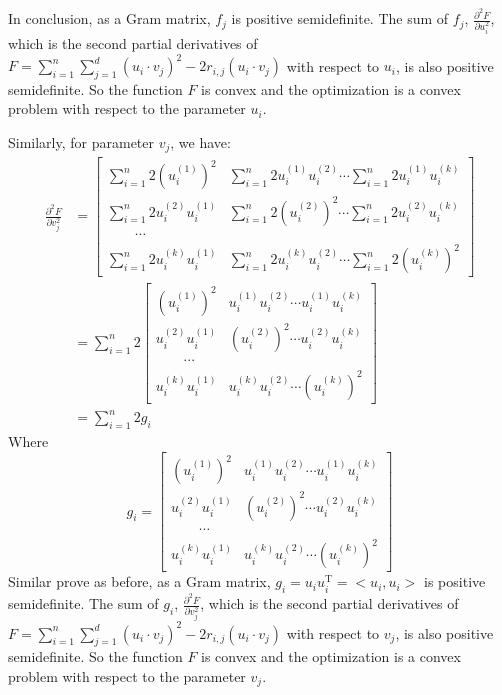 \documentclass[twoside,11pt]{homework}
\begin{document}
In conclusion, as a Gram matrix, $f_j$ is  positive semidefinite.
The sum of $f_j$, $\frac{\partial^2 F}{\partial u_i ^2}$, which is the second partial derivatives of $F = \sum\limits_{i=1}^n \sum\limits_{j=1}^d (u_i \cdot v_j)^2 - 2r_{i, j} (u_i \cdot v_j)$ with respect to $u_i$, is also positive semidefinite.
So the function $F$ is convex and the optimization is a convex problem with respect to the parameter $u_i$.

Similarly, for parameter $v_j$, we have:
%
\begin{equation}
\begin{split}
\frac{\partial^2 F}{\partial v_j ^2} &= \left [ 
						 \begin{matrix}
						 	\sum\limits_{i=1}^n 2(u_i^{(1)})^2 & \sum\limits_{i=1}^n 2u_i^{(1)}u_i^{(2)}	   \cdots \sum\limits_{i=1}^n 2u_i^{(1)}u_i^{(k)}   \\
							\sum\limits_{i=1}^n 2u_i^{(2)}u_i^{(1)} & \sum\limits_{i=1}^n 2(u_i^{(2)})^2	   \cdots \sum\limits_{i=1}^n 2u_i^{(2)}u_i^{(k)} \\
							\qquad \cdots \\
							\sum\limits_{i=1}^n 2u_i^{(k)}u_i^{(1)} & \sum\limits_{i=1}^n 2u_i^{(k)}u_i^{(2)}	   \cdots \sum\limits_{i=1}^n 2(u_i^{(k)})^2
						 \end{matrix}
						\right ] \\
					    &=\sum\limits_{i=1}^n 2\left [ 
						 \begin{matrix}
						 	 (u_i^{(1)})^2 &  u_i^{(1)}u_i^{(2)}   \cdots  u_i^{(1)}u_i^{(k)}   \\
							 u_i^{(2)}u_i^{(1)} & (u_i^{(2)})^2	   \cdots u_i^{(2)}u_i^{(k)} \\
							\qquad  \cdots \\
							u_i^{(k)}u_i^{(1)} & u_i^{(k)}u_i^{(2)}	   \cdots (u_i^{(k)})^2
						 \end{matrix}
						\right ] \\
					     &= \sum\limits_{i=1}^n 2g_i
\end{split}
\end{equation}
%
Where 
%
\begin{equation}
g_i = \left [ 
						 \begin{matrix}
						 	 (u_i^{(1)})^2 &  u_i^{(1)}u_i^{(2)}   \cdots  u_i^{(1)}u_i^{(k)}   \\
							 u_i^{(2)}u_i^{(1)} & (u_i^{(2)})^2	   \cdots u_i^{(2)}u_i^{(k)} \\
							\qquad  \cdots \\
							u_i^{(k)}u_i^{(1)} & u_i^{(k)}u_i^{(2)}	   \cdots (u_i^{(k)})^2
						 \end{matrix}
						\right ] 
\end{equation}
%
Similar prove as before, as a Gram matrix, $g_i = u_i u_i^{\mathrm{T}} = <u_i, u_i>$ is  positive semidefinite.
The sum of $g_i$, $\frac{\partial^2 F}{\partial v_j ^2}$, which is the second partial derivatives of $F = \sum\limits_{i=1}^n \sum\limits_{j=1}^d (u_i \cdot v_j)^2 - 2r_{i, j} (u_i \cdot v_j)$ with respect to $v_j$, is also positive semidefinite.
So the function $F$ is convex and the optimization is a convex problem with respect to the parameter $v_j$.
\end{document}
